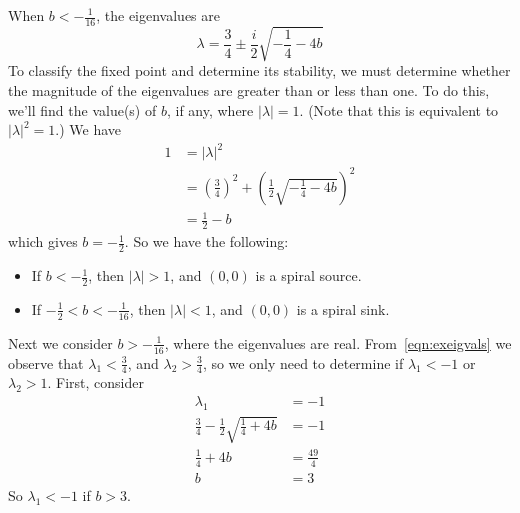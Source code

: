\documentclass[reqno]{immbook}
\begin{document}
When $b < -\frac{1}{16}$, the eigenvalues are
\begin{equation}
   \lambda = \frac{3}{4} \pm \frac{i}{2}\sqrt{-\frac{1}{4}-4b}
\end{equation}
To classify the fixed point and determine its stability,
we must determine whether the magnitude of the eigenvalues
are greater than or less than one.  To do this, we'll find the
value(s) of $b$, if any, where $|\lambda| = 1$.
(Note that this is equivalent to $|\lambda|^2 = 1$.)
We have
\begin{equation}
\begin{split}
  1 & = |\lambda|^2 \\
    & = \left(\frac{3}{4}\right)^2 + \left(\frac{1}{2}\sqrt{-\frac{1}{4}-4b} \right)^2 \\
    & = \frac{1}{2} - b
\end{split}
\end{equation}
which gives $b=-\frac{1}{2}$.
So we have the following:
\begin{itemize}
\item
If $b < -\frac{1}{2}$, then $|\lambda| > 1$, and $(0,0)$ is a spiral source.
\item
If $-\frac{1}{2} < b < -\frac{1}{16}$, then $|\lambda| < 1$, and $(0,0)$
is a spiral sink.
\end{itemize}
Next we consider $b > -\frac{1}{16}$, where the eigenvalues are real.
From~\eqref{eqn:exeigvals} we observe that $\lambda_1 < \frac{3}{4}$,
and $\lambda_2 > \frac{3}{4}$, so we only need to determine
if $\lambda_1 < -1$ or  $\lambda_2 > 1$.
First, consider
\begin{equation}
\begin{split}
   \lambda_1 & = -1 \\
   \frac{3}{4} - \frac{1}{2} \sqrt{\frac{1}{4}+4b} & = -1 \\
   \frac{1}{4}+4b & = \frac{49}{4} \\
   b & = 3
\end{split}
\end{equation}
So $\lambda_1 < -1$ if $b > 3$.
\end{document}

